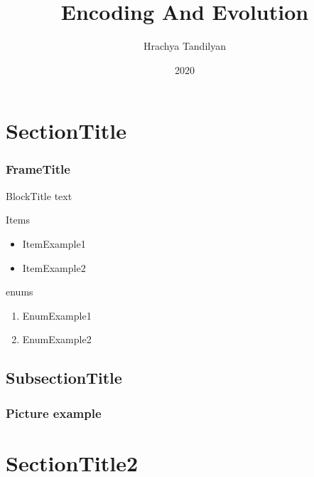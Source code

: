 \documentclass{beamer}
\begin{document}
\title[Encoding And Evolution]{Encoding And Evolution}
\author[Hrachya Tandilyan\copyright]{Hrachya Tandilyan}
\date{2020}

\begin{frame}
\titlepage
\end{frame}

\section{SectionTitle}
\begin{frame}\frametitle{FrameTitle}
\begin{block}{BlockTitle}
    text
\end{block}
\vfill
Items
\begin{itemize}
    \item ItemExample1
    \item ItemExample2
\end{itemize}
\vfill
enums
\begin{enumerate}
    \item EnumExample1
    \item EnumExample2
\end{enumerate}
\end{frame}

\subsection{SubsectionTitle}
\begin{frame}\frametitle{Picture example}
\end{frame}

\section{SectionTitle2}
\end{document}
